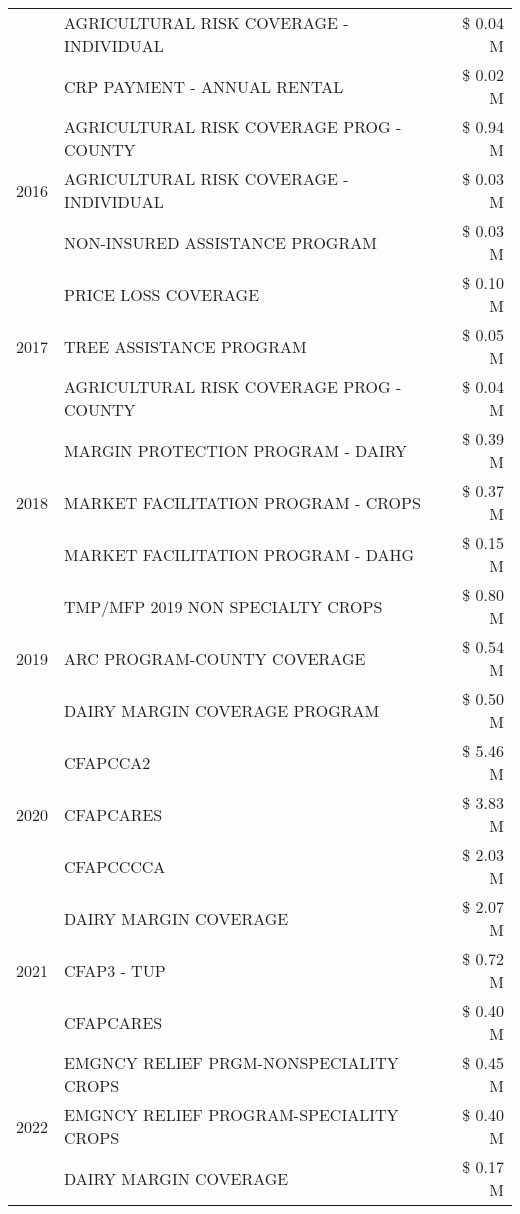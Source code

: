 \begin{tabular}{llr}
 & AGRICULTURAL RISK COVERAGE - INDIVIDUAL & \$ 0.04 M \\
 & CRP PAYMENT - ANNUAL RENTAL & \$ 0.02 M \\
\cline{1-3}
\multirow[t]{3}{*}{2016} & AGRICULTURAL RISK COVERAGE PROG - COUNTY & \$ 0.94 M \\
 & AGRICULTURAL RISK COVERAGE - INDIVIDUAL & \$ 0.03 M \\
 & NON-INSURED ASSISTANCE PROGRAM & \$ 0.03 M \\
\cline{1-3}
\multirow[t]{3}{*}{2017} & PRICE LOSS COVERAGE & \$ 0.10 M \\
 & TREE ASSISTANCE PROGRAM & \$ 0.05 M \\
 & AGRICULTURAL RISK COVERAGE PROG - COUNTY & \$ 0.04 M \\
\cline{1-3}
\multirow[t]{3}{*}{2018} & MARGIN PROTECTION PROGRAM - DAIRY & \$ 0.39 M \\
 & MARKET FACILITATION PROGRAM - CROPS & \$ 0.37 M \\
 & MARKET FACILITATION PROGRAM - DAHG & \$ 0.15 M \\
\cline{1-3}
\multirow[t]{3}{*}{2019} & TMP/MFP 2019 NON SPECIALTY CROPS & \$ 0.80 M \\
 & ARC PROGRAM-COUNTY COVERAGE & \$ 0.54 M \\
 & DAIRY MARGIN COVERAGE PROGRAM & \$ 0.50 M \\
\cline{1-3}
\multirow[t]{3}{*}{2020} & CFAPCCA2 & \$ 5.46 M \\
 & CFAPCARES & \$ 3.83 M \\
 & CFAPCCCCA & \$ 2.03 M \\
\cline{1-3}
\multirow[t]{3}{*}{2021} & DAIRY MARGIN COVERAGE & \$ 2.07 M \\
 & CFAP3 - TUP & \$ 0.72 M \\
 & CFAPCARES & \$ 0.40 M \\
\cline{1-3}
\multirow[t]{3}{*}{2022} & EMGNCY RELIEF PRGM-NONSPECIALITY CROPS & \$ 0.45 M \\
 & EMGNCY RELIEF PROGRAM-SPECIALITY CROPS & \$ 0.40 M \\
 & DAIRY MARGIN COVERAGE & \$ 0.17 M \\
\cline{1-3}
\bottomrule
\end{tabular}
